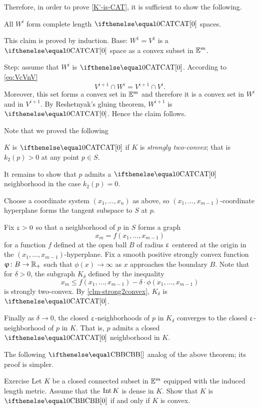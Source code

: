 Therefore, in order to prove \ref{K'-is-CAT}, 
it is sufficient to show the following.
\begin{clm}{}
All $W^i$ form complete length $\CAT{0}$ spaces.
\end{clm}

This claim is proved by induction.
Base: $W^1=V^1$ is a $\CAT{0}$ space as a convex subset in $\mathbb{E}^m$.

Step: assume that $W^i$ is $\CAT0$.
According to \ref{eq:VcVnV}
\[V^{i+1}\cap W^i=V^{i+1}\cap V^i.\] 
Moreover, this set forms a convex set in $\mathbb{E}^m$ 
and therefore it is a convex set in $W^i$ and in $V^{i+1}$.
By Reshetnyak's gluing theorem, $W^{i+1}$ is $\CAT0$.
Hence the claim follows.
\claimqeds

Note that we proved the following
\begin{clm}{}\label{clm-strong2convex}
$K$ is $\CAT0$ if $K$ is \emph{strongly two-convex};
that is $k_2(p)>0$ at any point $p\in S$.
\end{clm}


It remains to show that $p$ admits a $\CAT0$ neighborhood in the case $k_2(p)=0$.

Choose a coordinate system $(x_1,\dots,x_n)$ as above,
so $(x_1,\dots,x_{m-1})$-coordinate hyperplane forms the tangent subspace to $S$ at $p$.

Fix $\upvarepsilon>0$ so that a neighborhood of $p$ in $S$ 
forms a graph
\[x_m= f(x_1,\dots,x_{m-1})\]
for a function $f$ defined at the open ball $B$ of radius $\upvarepsilon$  centered at the origin in the $(x_1,\dots,x_{m-1})$-hyperplane.
Fix a smooth positive strongly convex function $\phi\:B\to \RR_+$
such that $\phi(x)\to\infty$ as $x$ approaches the boundary $B$.
Note that for $\delta>0$, the subgraph $K_\delta$ defined by the inequality
\[x_m\le f(x_1,\dots,x_{m-1})-\delta\cdot\phi(x_1,\dots,x_{m-1})\]
is strongly two-convex.
By \ref{clm-strong2convex}, $K_\delta$ is $\CAT0$.

Finally as $\delta\to0$, the closed $\upvarepsilon$-neighborhoods of $p$ in $K_\delta$ 
converges to the closed $\upvarepsilon$-neighborhood of $p$ in $K$.
That is, $p$ admits a closed $\CAT0$ neighborhood in $K$.
\qeds

The following $\Alex{}$ analog of the above theorem; 
its proof is simpler.

\begin{thm}{Exercise}\label{ex:set-with-smooth-bry:CBB}
Let $K$ be a closed connected subset in $\mathbb{E}^m$ equipped with the induced length metric.
Assume that the $\mathop{\rm Int}\nolimits K$ is dense in $K$.
Show that 
$K$ is $\Alex0$ if and only if $K$ is convex. 
\end{thm}

